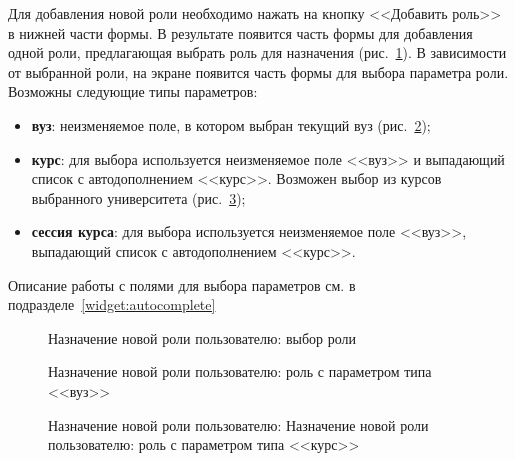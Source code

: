 Для добавления новой роли необходимо нажать на кнопку <<Добавить роль>> в нижней части формы. В результате появится часть формы для
добавления одной роли, предлагающая выбрать роль для назначения (рис.~\ref{img:employee:choose_role}). В зависимости от 
выбранной роли, на экране появится часть формы для выбора параметра роли. Возможны следующие типы параметров:
\begin{itemize}
	\item {\bf вуз}: неизменяемое поле, в котором выбран текущий вуз (рис.~\ref{img:employee:uni_role});
	\item {\bf курс}: для выбора используется неизменяемое поле <<вуз>> и выпадающий список с автодополнением <<курс>>. 
	Возможен выбор из курсов выбранного университета (рис.~\ref{img:employee:course_role});
	\item {\bf сессия курса}:  для выбора используется неизменяемое поле <<вуз>>, выпадающий список с автодополнением <<курс>>.
\end{itemize}

Описание работы с полями для выбора параметров см. в подразделе~\ref{widget:autocomplete}

\begin{figure}[H]
	\caption{Назначение новой роли пользователю: выбор роли}
	\label{img:employee:choose_role}
\end{figure}
\begin{figure}[H]
	\caption{Назначение новой роли пользователю: роль с параметром типа <<вуз>>}
	\label{img:employee:uni_role}
\end{figure}
\begin{figure}[H]
	\caption{Назначение новой роли пользователю: Назначение новой роли пользователю: роль с параметром типа <<курс>>}
	\label{img:employee:course_role}
\end{figure}

